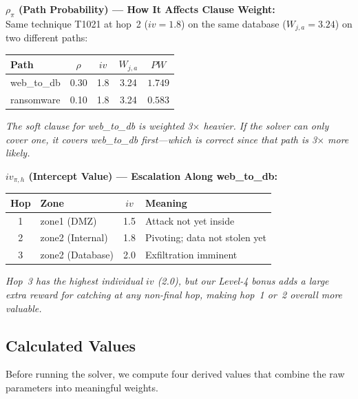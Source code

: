 \documentclass[journal]{IEEEtran}
\begin{document}
\begin{examplebox}
\textbf{$\rho_\pi$ (Path Probability) ---
How It Affects Clause Weight:}\\[3pt]
Same technique T1021 at hop~2 ($iv=1.8$) on the same
database ($W_{j,a}=3.24$) on two different paths:
\begin{center}
\small
\renewcommand{\arraystretch}{1.1}
\begin{tabular}{@{}lcccc@{}}
\toprule
\textbf{Path} & $\rho$ & $iv$ & $W_{j,a}$ & $PW$ \\
\midrule
web\_to\_db & 0.30 & 1.8 & 3.24 & $\mathbf{1.749}$ \\
ransomware  & 0.10 & 1.8 & 3.24 & $\mathbf{0.583}$ \\
\bottomrule
\end{tabular}
\end{center}
\textit{The soft clause for web\_to\_db is weighted
3$\times$ heavier.
If the solver can only cover one, it covers web\_to\_db
first---which is correct since that path is 3$\times$
more likely.}
\end{examplebox}

\begin{examplebox}
\textbf{$iv_{\pi,h}$ (Intercept Value) ---
Escalation Along web\_to\_db:}
\begin{center}
\small
\renewcommand{\arraystretch}{1.1}
\begin{tabular}{@{}clcl@{}}
\toprule
\textbf{Hop} & \textbf{Zone} & $iv$ & \textbf{Meaning} \\
\midrule
1 & zone1 (DMZ)      & 1.5 & Attack not yet inside \\
2 & zone2 (Internal) & 1.8 & Pivoting; data not stolen yet \\
3 & zone2 (Database) & 2.0 & Exfiltration imminent \\
\bottomrule
\end{tabular}
\end{center}
\textit{Hop~3 has the highest individual $iv$ (2.0), but our
Level-4 bonus adds a large extra reward for catching at any
\emph{non-final} hop, making hop~1 or~2 overall more
valuable.}
\end{examplebox}

\subsection{Calculated Values}

Before running the solver, we compute four derived values
that combine the raw parameters into meaningful weights.
\end{document}
